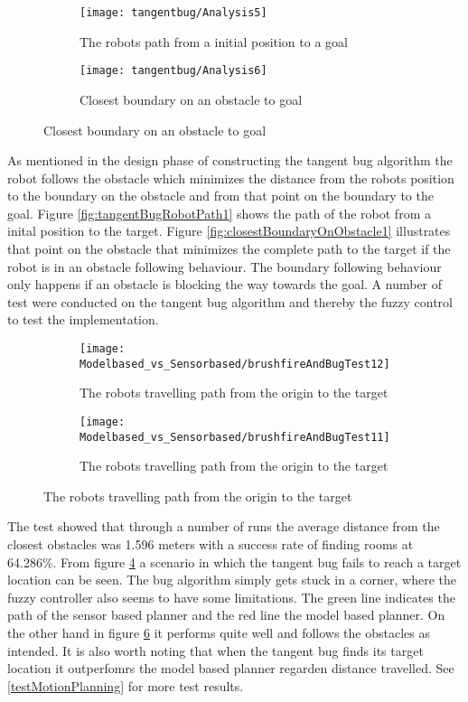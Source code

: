 \documentclass[../Head/Main.tex]{subfiles}
\begin{document}
  \begin{figure}[H]
  \begin{subfigure}[b]{0.59\textwidth}
    \centering
    \texttt{[image: tangentbug/Analysis5]}
    \caption{The robots path from a initial position to a goal}
    \label{fig:tangentBugRobotPath3}
  \end{subfigure}
  \hfill
   \begin{subfigure}[b]{0.39\textwidth}
    \centering
    \texttt{[image: tangentbug/Analysis6]}
    \caption{Closest boundary on an obstacle to goal}
    \label{fig:closestBoundaryOnObstacle3}
  \end{subfigure}
  \end{figure}
  
As mentioned in the design phase of constructing the tangent bug algorithm the robot follows the obstacle which minimizes the distance from the robots position to the boundary on the obstacle and from that point on the boundary to the goal. Figure \ref{fig:tangentBugRobotPath1} shows the path of the robot from a inital position to the target. Figure \ref{fig:closestBoundaryOnObstacle1} illustrates that point on the obstacle that minimizes the complete path to the target if the robot is in an obstacle following behaviour. The boundary following behaviour only happens if an obstacle is blocking the way towards the goal. A number of test were conducted on the tangent bug algorithm and thereby the fuzzy control to test the implementation.   


  \begin{figure}[H]
  \begin{subfigure}[b]{0.49\textwidth}
    \centering
    \texttt{[image: Modelbased\_vs\_Sensorbased/brushfireAndBugTest12]}
    \caption{The robots travelling path from the origin to the target}
    \label{fig:tangentBugAnalyseTest1}
  \end{subfigure}
  \hfill
   \begin{subfigure}[b]{0.49\textwidth}
    \centering
    \texttt{[image: Modelbased\_vs\_Sensorbased/brushfireAndBugTest11]}
    \caption{The robots travelling path from the origin to the target}
    \label{fig:tangentBugAnalyseTest2}
  \end{subfigure}
  \end{figure}
  
The test showed that through a number of runs the average distance from the closest obstacles was 1.596 meters with a success rate of finding rooms at 64.286\%. From figure \ref{fig:tangentBugAnalyseTest1} a scenario in which the tangent bug fails to reach a target location can be seen. The bug algorithm simply gets stuck in a corner, where the fuzzy controller also seems to have some limitations. The green line indicates the path of the sensor based planner and the red line the model based planner. On the other hand in figure \ref{fig:tangentBugAnalyseTest2} it performs quite well and follows the obstacles as intended. It is also worth noting that when the tangent bug finds its target location it outperfomrs the model based planner regarden distance travelled. See \ref{testMotionPlanning} for more test results. 
  
  
  
\end{document}
